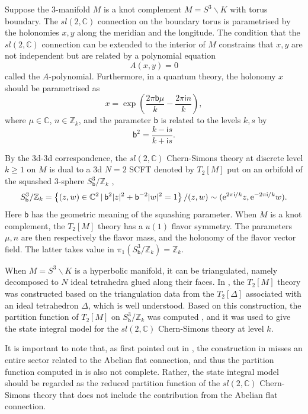 \documentclass[a4paper,11pt]{article}	%
\def\ms{\mathsf}
\def\IC{\mathbb{C}}
\def\IZ{\mathbb{Z}}
\newcommand{\re}{{\rm e}}
\newcommand{\ri}{{\mathsf{i}}}
\newcommand{\bb}{\ms{b}}
\begin{document}
Suppose the 3-manifold $M$ is a knot complement $M = S^3\backslash K$
with torus boundary.  The $sl(2,\IC)$ connection on the boundary torus
is parametrised by the holonomies $x,y$ along the meridian and the
longitude.  The condition that the $sl(2,\IC)$ connection can be
extended to the interior of $M$ constrains that $x,y$ are not
independent but are related by a polynomial equation
\begin{equation}
  A(x,y) = 0
\end{equation}
called the $A$-polynomial.
Furthermore, in a quantum theory, the holonomy $x$ should be
parametrised as
\begin{equation}
  x = \exp\left(\frac{2\pi \bb\mu}{k} - \frac{2\pi\ri n}{k}\right),
\end{equation}
where $\mu\in\IC$, $n\in\IZ_k$, and the parameter $\bb$ is related to
the levels $k,s$ by
\begin{equation}
  \bb^2 = \frac{k-\ri s}{k + \ri s}.
\end{equation}

By the 3d-3d correspondence, the $sl(2,\IC)$ Chern-Simons theory at
discrete level $k\geq 1$ on $M$ is dual to a 3d $N=2$ SCFT denoted by
$T_2[M]$ put on an orbifold of the squashed 3-sphere $S^3_\bb/\IZ_k$
\cite{Dimofte:2014zga},
\begin{equation}
  S^3_\bb/\IZ_k = \left\{(z,w)\in \IC^2 \,|\, \bb^2|z|^2 +
    \bb^{-2}|w|^2 = 1\right\}/ (z,w)\sim (\re^{2\pi\ri/k}z,\re^{-2\pi\ri/k}w).
\end{equation}
Here $\bb$ has the geometric meaning of the squashing parameter.  When
$M$ is a knot complement, the $T_2[M]$ theory has a $u(1)$ flavor
symmetry.  The parameters $\mu,n$ are then respectively the flavor
mass, and the holonomy of the flavor vector field.  The latter takes
value in $\pi_1(S^3_\bb/ \IZ_k) = \IZ_k$.

When $M = S^3\backslash K$ is a hyperbolic manifold, it can be
triangulated, namely decomposed to $N$ ideal tetrahedra glued along
their faces.  In \cite{Dimofte:2011ju}, the $T_2[M]$ theory was
constructed based on the triangulation data from the $T_2[\Delta]$
associated with an ideal tetrahedron $\Delta$, which is well
understood.  Based on this construction, the partition function of
$T_2[M]$ on $S^3_\bb/\IZ_k$ was computed \cite{Dimofte:2014zga}, and
it was used to give the state integral model for the $sl(2,\IC)$
Chern-Simons theory at level $k$.

It is important to note that, as first pointed out in
\cite{Chung:2014qpa}, the construction in \cite{Dimofte:2011ju} misses
an entire sector related to the Abelian flat connection, and thus the
partition function computed in \cite{Dimofte:2014zga} is also not
complete.  Rather, the state integral model should be regarded as the
reduced partition function of the $sl(2,\IC)$ Chern-Simons theory that
does not include the contribution from the Abelian flat connection.
\end{document}
